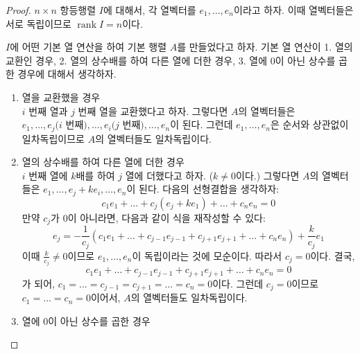 \documentclass[unfonts,oneside,a4paper]{oblivoir}
\theoremstyle{definition}
\theoremstyle{theorem}
\theoremstyle{theorem}
\theoremstyle{remark}
\theoremstyle{remark}
\theoremstyle{remark}
\theoremstyle{remark}
\renewcommand{\vec}[1]{\bm{\mathit{#1}}}
\newcommand{\vecz}{\bm{\mathrm{0}}}
\DeclareMathOperator{\rank}{rank}
\begin{document}
\begin{proof}
    $n \times n$ 항등행렬 $I$에 대해서, 각 열벡터를 $\vec e_1, \dots, \vec e_n$이라고 하자.
    이때 열벡터들은 서로 독립이므로 $\rank I = n$이다.

    $I$에 어떤 기본 열 연산을 하여 기본 행렬 $A$를 만들었다고 하자.
    기본 열 연산이 1. 열의 교환인 경우, 2. 열의 상수배를 하여 다른 열에 더한 경우, 3. 열에 0이 아닌 상수를 곱한 경우에 대해서 생각하자.
    \begin{enumerate}
        \item 열을 교환했을 경우\\
            $i$ 번째 열과 $j$ 번째 열을 교환했다고 하자.
            그렇다면 $A$의 열벡터들은 $\vec e_1, \dots, \vec e_j \text{($i$ 번째)}, \dots, \vec e_i \text{($j$ 번째)}, \dots, \vec e_n$이 된다.
            그런데 $\vec e_1, \dots, \vec e_n$은 순서와 상관없이 일차독립이므로 $A$의 열벡터들도 일차독립이다.
        \item 열의 상수배를 하여 다른 열에 더한 경우\\
            $i$ 번째 열에 $k$배를 하여 $j$ 열에 더했다고 하자.
            ($k \neq 0$이다.)
            그렇다면 $A$의 열벡터들은 $\vec e_1, \dots, \vec e_j + k \vec e_i, \dots, \vec e_n$이 된다.
            다음의 선형결합을 생각하자:
            \begin{equation*}
                c_1 \vec e_1 + \dots + c_j (\vec e_j + k \vec e_1) + \dots + c_n \vec e_n = \vecz
            \end{equation*}
            만약 $c_j$가 0이 아니라면, 다음과 같이 식을 재작성할 수 있다:
            \begin{equation*}
                \vec e_j = -\frac{1}{c_j} \left(c_1 \vec e_1 + \dots + c_{j - 1} \vec e_{j - 1} + c_{j + 1} \vec e_{j + 1} + \dots + c_n \vec e_n\right) + \frac{k}{c_j} \vec e_1
            \end{equation*}
            이때 $\frac{k}{c_j} \neq 0$이므로 $\vec e_1, \dots, \vec e_n$이 독립이라는 것에 모순이다.
            따라서 $c_j = 0$이다.
            결국,
            \begin{equation*}
                c_1 \vec e_1 + \dots + c_{j - 1} \vec e_{j - 1} + c_{j + 1} \vec e_{j + 1} + \dots + c_n \vec e_n = \vecz
            \end{equation*}
            가 되어, $c_1 = \dots = c_{j - 1} = c_{j + 1} = \dots = c_n = 0$이다.
            그런데 $c_j = 0$이므로 $c_1 = \dots = c_n = 0$이어서, $A$의 열벡터들도 일차독립이다.
        \item 열에 0이 아닌 상수를 곱한 경우\\

\end{enumerate}
\end{proof}
\end{document}
